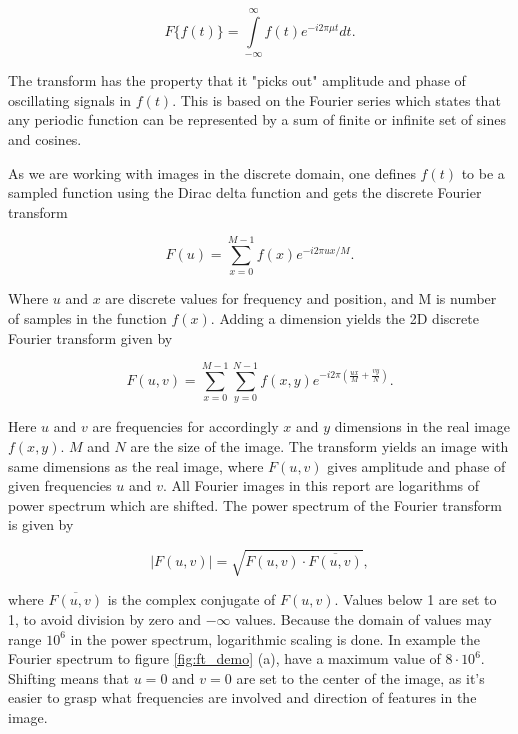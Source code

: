 \begin{equation}
F\{f(t)\} = \int \limits_{-\infty}^{\infty} f(t) e^{-i2\pi \mu t} dt.
\end{equation}

The transform has the property that it "picks out" amplitude and phase of oscillating signals in $f(t)$. This is based on the Fourier series which states that any periodic function can be represented by a sum of finite or infinite set of sines and cosines.

As we are working with images in the discrete domain, one defines $f(t)$ to be a sampled function using the Dirac delta function and gets the discrete Fourier transform

\begin{equation}
F(u) = \sum \limits_{x=0}^{M-1} f(x)e^{-i2 \pi ux/M}.
\end{equation}

Where $u$ and $x$ are discrete values for frequency and position, and M is number of samples in the function $f(x)$. Adding a dimension yields the 2D discrete Fourier transform given by

\begin{equation}
F(u,v) = \sum \limits_{x=0}^{M-1} \sum \limits_{y=0}^{N-1} f(x,y) e^{-i2 \pi \left( \frac{ux}{M} + \frac{vy}{N} \right)}.
\end{equation}

Here $u$ and $v$ are frequencies for accordingly $x$ and $y$ dimensions in the real image $f(x,y)$. $M$ and $N$ are the size of the image. The transform yields an image with same dimensions as the real image, where $F(u,v)$ gives amplitude and phase of given frequencies $u$ and $v$. All Fourier images in this report are logarithms of power spectrum which are shifted. The power spectrum of the Fourier transform is given by

\begin{equation}
|F(u,v)| = \sqrt{F(u,v) \cdot \overline{F(u,v)}},
\end{equation}

where $\overline{F(u,v)}$ is the complex conjugate of $F(u,v)$. Values below 1 are set to 1, to avoid division by zero and $-\infty$ values. Because the domain of values may range $10^6$ in the power spectrum, logarithmic scaling is done. In example the Fourier spectrum to figure \ref{fig:ft_demo} (a), have a maximum value of $8 \cdot 10^6$. Shifting means that $u=0$ and $v=0$ are set to the center of the image, as it's easier to grasp what frequencies are involved and direction of features in the image.

